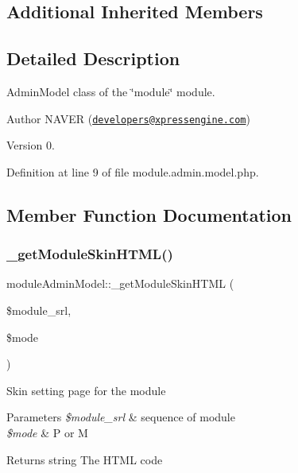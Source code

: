 \subsection*{Additional Inherited Members}


\subsection{Detailed Description}
Admin\+Model class of the \char`\"{}module\char`\"{} module. 

\begin{DoxyAuthor}{Author}
N\+A\+V\+ER (\href{mailto:developers@xpressengine.com}{\tt developers@xpressengine.\+com}) 
\end{DoxyAuthor}
\begin{DoxyVersion}{Version}
0. 
\end{DoxyVersion}


Definition at line 9 of file module.\+admin.\+model.\+php.



\subsection{Member Function Documentation}
\mbox{\label{classmoduleAdminModel_ac69c4e024dcabbcaa3f7a13a4c61af04}} 
\subsubsection{\texorpdfstring{\+\_\+get\+Module\+Skin\+H\+T\+M\+L()}{\_getModuleSkinHTML()}}
{\footnotesize\ttfamily module\+Admin\+Model\+::\+\_\+get\+Module\+Skin\+H\+T\+ML (\begin{DoxyParamCaption}\item[{}]{\$module\+\_\+srl,  }\item[{}]{\$mode }\end{DoxyParamCaption})}

Skin setting page for the module


\begin{DoxyParams}{Parameters}
{\em \$module\+\_\+srl} & sequence of module \\
\hline
{\em \$mode} & P or M \\
\hline
\end{DoxyParams}
\begin{DoxyReturn}{Returns}
string The H\+T\+ML code 
\end{DoxyReturn}


